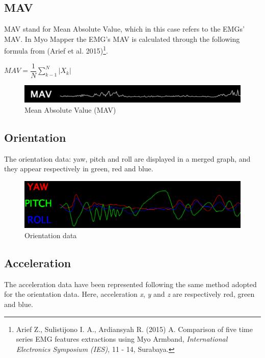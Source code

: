 \documentclass[12pt,a4paper]{article}
\begin{document}
		\subsection{MAV}

		MAV stand for Mean Absolute Value, which in this case refers to the EMGs' MAV. In Myo Mapper the EMG's MAV is calculated through the following formula from (Arief et al. 2015)\footnote{Arief Z., Sulistijono I. A., Ardiansyah R. (2015) A. Comparison of five time series EMG features extractions using Myo Armband, \textit{International Electronics Symposium (IES)}, 11 - 14, Surabaya.}.
		
		\begin{math}
		     MAV = \dfrac{1}{N} \displaystyle\sum_{k-1}^{N} \lvert X_{k} \rvert
		\end{math}
		
				\begin{figure}[h]
					\centering
					\includegraphics[width=0.6\linewidth]{../MyoMapper-MAV}
					\caption{Mean Absolute Value (MAV)}
					\label{fig:MyoMapper-MAV}
				\end{figure}
	
		\subsection{Orientation}
		The orientation data: yaw, pitch and roll are displayed in a merged graph, and they appear respectively in green, red and blue.
		
		\begin{figure}[h]
			\centering
			\includegraphics[width=0.6\linewidth]{../MyoMapper-YPR}
			\caption{Orientation data}
			\label{fig:MyoMapper-Orientation}
		\end{figure}
	
		\subsection{Acceleration}
		The acceleration data have been represented following the same method adopted for the orientation data. Here, acceleration \textit{x}, \textit{y} and \textit{z} are respectively red, green and blue.
	
\end{document}
